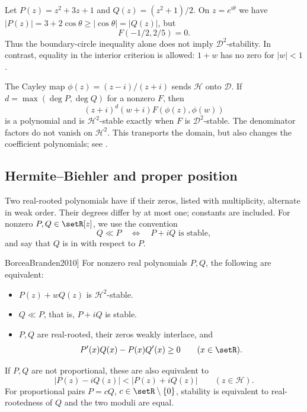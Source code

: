 \begin{example}
Let $P(z)=z^2+3z+1$ and $Q(z)=(z^2+1)/2$.
On $z=e^{i\theta}$ we have
$|P(z)|=3+2\cos\theta\geq|\cos\theta|=|Q(z)|$,
but
\[
 F(-1/2,2/5)=0.
\]
Thus the boundary-circle inequality alone does not imply
$\mathcal D^2$-stability. In contrast, equality in the interior criterion
is allowed: $1+w$ has no zero for $|w|<1$.
\end{example}

The Cayley map $\phi(z)=(z-i)/(z+i)$ sends $\mathcal H$ onto
$\mathcal D$. If $d=\max(\deg P,\deg Q)$ for a nonzero $F$, then
\[
 (z+i)^d(w+i)F(\phi(z),\phi(w))
\]
is a polynomial and is $\mathcal H^2$-stable exactly when $F$ is
$\mathcal D^2$-stable. The denominator factors do not vanish on
$\mathcal H^2$. This transports the domain, but also changes the
coefficient polynomials; see \cite{BorceaBranden2009I}.

\subsection[hermiteBiehler]{Hermite--Biehler and proper position}

Two real-rooted polynomials have 
if their zeros, listed with multiplicity, alternate in weak order.
Their degrees differ by at most one; constants are included.
For nonzero $P,Q\in\setR[z]$, we use the convention
\[
 Q\ll P \quad\Longleftrightarrow\quad P+iQ\text{ is stable},
\]
and say that $Q$ is in  with respect to $P$.

\begin{theorem}[Hermite--Biehler,
  \cite[Thm.~1.4 and Lemma~2.2]{BorceaBranden2010}]
\label{hermiteBiehlerStability}
For nonzero real polynomials $P,Q$, the following are equivalent:
\begin{itemize}
\item $P(z)+wQ(z)$ is $\mathcal H^2$-stable.
\item $Q\ll P$, that is, $P+iQ$ is stable.
\item $P,Q$ are real-rooted, their zeros weakly interlace, and
  \[
    P'(x)Q(x)-P(x)Q'(x)\geq0 \qquad (x\in\setR).
  \]
\end{itemize}
If $P,Q$ are not proportional, these are also equivalent to
\[
 |P(z)-iQ(z)|<|P(z)+iQ(z)| \qquad (z\in\mathcal H).
\]
For proportional pairs $P=cQ$, $c\in\setR\setminus\{0\}$,
stability is equivalent to real-rootedness of $Q$ and the two
moduli are equal.
\end{theorem}

